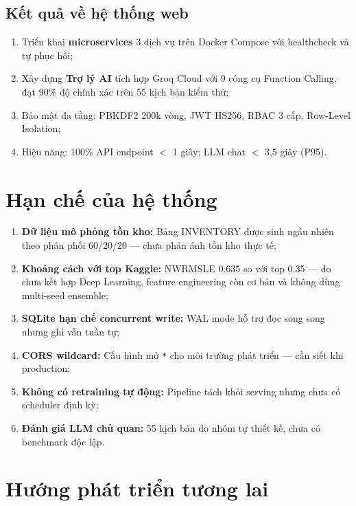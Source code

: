 \documentclass[12pt,a4paper]{report}
\begin{document}
\subsection{Kết quả về hệ thống web}

\begin{enumerate}
    \item Triển khai \textbf{microservices} 3 dịch vụ trên Docker Compose với healthcheck và tự phục hồi;
    \item Xây dựng \textbf{Trợ lý AI} tích hợp Groq Cloud với 9 công cụ Function Calling, đạt 90\% độ chính xác trên 55 kịch bản kiểm thử;
    \item Bảo mật đa tầng: PBKDF2 200k vòng, JWT HS256, RBAC 3 cấp, Row-Level Isolation;
    \item Hiệu năng: 100\% API endpoint $<$ 1 giây; LLM chat $<$ 3,5 giây (P95).
\end{enumerate}

\section{Hạn chế của hệ thống}

\begin{enumerate}
    \item \textbf{Dữ liệu mô phỏng tồn kho:} Bảng INVENTORY được sinh ngẫu nhiên theo phân phối 60/20/20 --- chưa phản ánh tồn kho thực tế;
    
    \item \textbf{Khoảng cách với top Kaggle:} NWRMSLE 0.635 so với top 0.35 --- do chưa kết hợp Deep Learning, feature engineering còn cơ bản và không dùng multi-seed ensemble;
    
    \item \textbf{SQLite hạn chế concurrent write:} WAL mode hỗ trợ đọc song song nhưng ghi vẫn tuần tự;
    
    \item \textbf{CORS wildcard:} Cấu hình mở \texttt{*} cho môi trường phát triển --- cần siết khi production;
    
    \item \textbf{Không có retraining tự động:} Pipeline tách khỏi serving nhưng chưa có scheduler định kỳ;
    
    \item \textbf{Đánh giá LLM chủ quan:} 55 kịch bản do nhóm tự thiết kế, chưa có benchmark độc lập.
\end{enumerate}

\section{Hướng phát triển tương lai}
\end{document}
